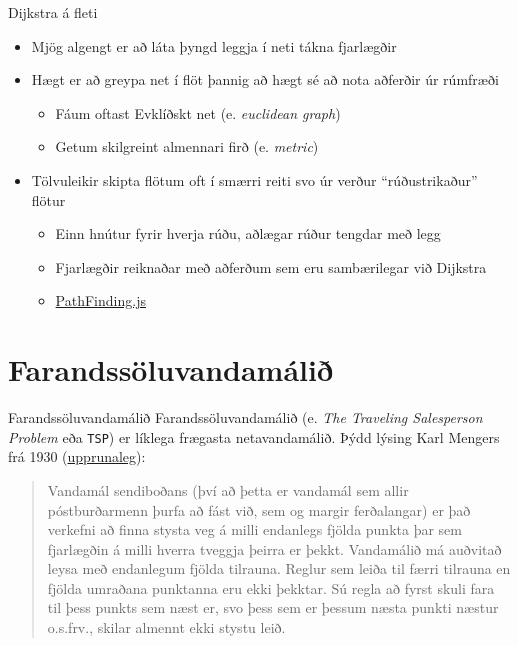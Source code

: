 \documentclass[handout]{beamer}
\begin{document}
\begin{frame}{Dijkstra á fleti}
    \begin{itemize}
        \item Mjög algengt er að láta þyngd leggja í neti tákna fjarlægðir 
        \item Hægt er að greypa net í flöt þannig að hægt sé að nota aðferðir úr rúmfræði
        \begin{itemize}
            \item Fáum oftast Evklíðskt net (e. \emph{euclidean graph})
            \item Getum skilgreint almennari firð (e. \emph{metric})
        \end{itemize}
        \item Tölvuleikir skipta flötum oft í smærri reiti svo úr verður ``rúðustrikaður'' flötur
        \begin{itemize}
            \item Einn hnútur fyrir hverja rúðu, aðlægar rúður tengdar með legg
            \item Fjarlægðir reiknaðar með aðferðum sem eru sambærilegar við Dijkstra
            \item \href{https://qiao.github.io/PathFinding.js/visual/}{PathFinding.js}
        \end{itemize}
    \end{itemize}
\end{frame}

\section{Farandssöluvandamálið}

\begin{frame}{Farandssöluvandamálið}
    Farandssöluvandamálið (e. \emph{The Traveling Salesperson Problem} eða \texttt{TSP}) er líklega frægasta netavandamálið. Þýdd lýsing Karl Mengers frá 1930 (\href{https://homepages.cwi.nl/~lex/files/histco.pdf}{upprunaleg}):
    \begin{quote}
        Vandamál sendiboðans (því að þetta er vandamál sem allir póstburðarmenn þurfa að fást við, sem og margir ferðalangar) er það verkefni að finna stysta veg á milli endanlegs fjölda punkta þar sem fjarlægðin á milli hverra tveggja þeirra er þekkt. Vandamálið má auðvitað leysa með endanlegum fjölda tilrauna. Reglur sem leiða til færri tilrauna en fjölda umraðana punktanna eru ekki þekktar. Sú regla að fyrst skuli fara til þess punkts sem næst er, svo þess sem er þessum næsta punkti næstur o.s.frv., skilar almennt ekki stystu leið.
    \end{quote}
\end{frame}
\end{document}
